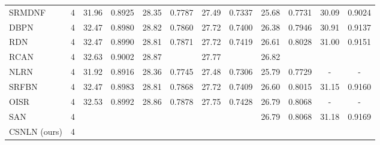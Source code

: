 \documentclass[10pt,twocolumn,letterpaper]{article}
\begin{document}
\begin{table*}[thbp]
\begin{center}
\begin{tabular}{|l|c|c|c|c|c|c|c|c|c|c|c|}
\\
SRMDNF~\cite{zhang2018learning} & 4 
& 31.96
 & 0.8925
  & 28.35
   & 0.7787
    & 27.49
     & 0.7337
      & 25.68
       & 0.7731
        & 30.09
         & 0.9024
                   
\\
DBPN~\cite{haris2018deep} & 4 
& 32.47
 & 0.8980
  & 28.82
   & 0.7860
    & 27.72
     & 0.7400
      & 26.38
       & 0.7946
        & 30.91
         & 0.9137
         
\\
RDN~\cite{zhang2018residual} & 4 
& 32.47
 & 0.8990
  & 28.81
   & 0.7871
    & 27.72
     & 0.7419
      & 26.61
       & 0.8028
        & 31.00
         & 0.9151
         
\\
RCAN~\cite{zhang2018image}& 4 
& {32.63}
 & {0.9002}
  & {28.87}
   &\color{red}{0.7889}
    & {27.77}
     & \color{blue}{0.7436}
      &\color{blue} {26.82}
       & \color{blue}{0.8087}
        &\color{blue}{31.22}
         & \color{blue}{0.9173}
         
                   
\\
NLRN~\cite{liu2018non}& 4 
& {31.92}
 & {0.8916}
  & {28.36}
   & {0.7745}
    & {27.48}
     & {0.7306}
      & {25.79}
       & {0.7729}
        & {-}
         & {-}
\\
SRFBN~\cite{li2019feedback} & 4 
& {32.47}
 & {0.8983}
  & {28.81}
   & {0.7868}
    & {27.72}
     & {0.7409}
      & {26.60}
       & {0.8015}
        & {31.15}
         & {0.9160}
\\
OISR~\cite{he2019ode} & 4 
&{32.53}
 &{0.8992}
  &{28.86}
   & {0.7878}
    &{27.75}
     & {0.7428}
      & {26.79}
       & {0.8068}
        & {-}
         & {-}
\\
SAN~\cite{dai2019second} & 4 
& \color{blue}{32.64}
 &\color{blue}{0.9003}
  &\color{blue}{28.92}
   &\color{blue}{0.7888}
    &\color{blue}{27.78}
     & \color{blue}{0.7436}
      & {26.79}
       & {0.8068}
        & {31.18}
         & {0.9169}
\\
CSNLN (ours)  & 4 
& \color{red}{32.68}
 & \color{red}{0.9004}
  & \color{red}{28.95}
   & \color{blue}{0.7888}
    & \color{red}{27.80}
     & \color{red}{0.7439}
      & \color{red}{27.22}
       & \color{red}{0.8168}
        & \color{red}{31.43}
         & \color{red}{0.9201}
         

\\
\hline             
\end{tabular}
\end{center}
\end{table*}
 
\end{document}
